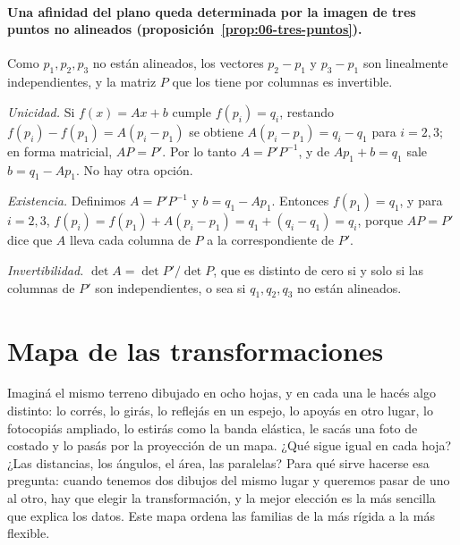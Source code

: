 \paragraph{Una afinidad del plano queda determinada por la imagen de tres puntos no alineados
(proposición~\ref{prop:06-tres-puntos}).}
\begin{demostracion}
Como \(p_1,p_2,p_3\) no están alineados, los vectores \(p_2-p_1\) y \(p_3-p_1\) son linealmente
independientes, y la matriz \(P\) que los tiene por columnas es invertible.

\emph{Unicidad.} Si \(f(x)=Ax+b\) cumple \(f(p_i)=q_i\), restando
\(f(p_i)-f(p_1)=A(p_i-p_1)\) se obtiene \(A(p_i-p_1)=q_i-q_1\) para \(i=2,3\); en forma matricial,
\(AP=P'\). Por lo tanto \(A=P'P^{-1}\), y de \(Ap_1+b=q_1\) sale \(b=q_1-Ap_1\). No hay otra
opción.

\emph{Existencia.} Definimos \(A=P'P^{-1}\) y \(b=q_1-Ap_1\). Entonces \(f(p_1)=q_1\), y para
\(i=2,3\), \(f(p_i)=f(p_1)+A(p_i-p_1)=q_1+(q_i-q_1)=q_i\), porque \(AP=P'\) dice que
\(A\) lleva cada columna de \(P\) a la correspondiente de \(P'\).

\emph{Invertibilidad.} \(\det A=\det P'/\det P\), que es distinto de cero si y solo si las
columnas de \(P'\) son independientes, o sea si \(q_1,q_2,q_3\) no están alineados.
\end{demostracion}

\section{Mapa de las transformaciones}\label{sec:mapa-transformaciones}


Imaginá el mismo terreno dibujado en ocho hojas, y en cada una le hacés algo distinto: lo
corrés, lo girás, lo reflejás en un espejo, lo apoyás en otro lugar, lo fotocopiás ampliado, lo
estirás como la banda elástica, le sacás una foto de costado y lo pasás por la proyección de un
mapa. ¿Qué sigue igual en cada hoja? ¿Las distancias, los ángulos, el área, las paralelas? Para
qué sirve hacerse esa pregunta: cuando tenemos dos dibujos del mismo lugar y queremos pasar de
uno al otro, hay que elegir la transformación, y la mejor elección es la más sencilla que
explica los datos. Este mapa ordena las familias de la más rígida a la más flexible.

